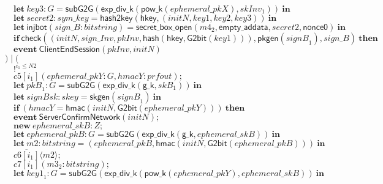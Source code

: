 \documentclass{article}
\newcommand{\cinput}[2]{{#1}({#2})}
\newcommand{\coutput}[2]{\overline{#1}\langle{#2}\rangle}
\newcommand{\kw}[1]{\mathbf{#1}}
\newcommand{\kwf}[1]{\mathsf{#1}}
\newcommand{\var}[1]{\mathit{#1}}
\newcommand{\kwt}[1]{\mathit{#1}}
\newcommand{\kwp}[1]{\mathit{#1}}
\newcommand{\kwc}[1]{\mathit{#1}}
\begin{document}
\begin{tabbing}
\>$\quad \kw{let}\ \var{key3}: \kwt{G} = \kwf{subG2G}(\kwf{exp{\_}div{\_}k}(\kwf{pow{\_}k}(\var{ephemeral{\_}pkX}), \var{skInv}_{1}))\ \kw{in}$\\
\>$\quad \kw{let}\ \var{secret2}: \kwt{sym{\_}key} = \kwf{hash2key}(\kwf{hkey}, \kwf{}(\var{initN}, \var{key1}, \var{key2}, \var{key3}))\ \kw{in}$\\
\>$\quad \kw{let}\ \kwf{injbot}(\var{sign{\_}B}: \kwt{bitstring}) = \kwf{secret{\_}box{\_}open}(\var{m4}_{2}, \kwf{empty{\_}addata}, \var{secret2}, \kwf{nonce0})\ \kw{in}$\\
\>$\quad \kw{if}\ \kwf{check}(\kwf{}(\var{initN}, \var{sign{\_}Inv}, \var{pkInv}, \kwf{hash}(\kwf{hkey}, \kwf{G2bit}(\var{key1}))), \kwf{pkgen}(\var{signB}_{1}), \var{sign{\_}B})\ \kw{then}$\\
\>$\quad \kw{event}\ \kwf{ClientEndSession}(\var{pkInv}, \var{initN})$\\
\>$) \mid ($\\
\>$\quad !^{\var{i}_{1} \leq \kwp{N2}}$\\
\>$\quad \cinput{\kwc{c5}[\var{i}_{1}]}{\var{ephemeral{\_}pkY}: \kwt{G}, \var{hmacY}: \kwt{prfout}};$\\
\>$\quad \kw{let}\ \var{pkB}_{1}: \kwt{G} = \kwf{subG2G}(\kwf{exp{\_}div{\_}k}(\kwf{g{\_}k}, \var{skB}_{1}))\ \kw{in}$\\
\>$\quad \kw{let}\ \var{signBsk}: \kwt{skey} = \kwf{skgen}(\var{signB}_{1})\ \kw{in}$\\
\>$\quad \kw{if}\ (\var{hmacY}  =  \kwf{hmac}(\var{initN}, \kwf{G2bit}(\var{ephemeral{\_}pkY})))\ \kw{then}$\\
\>$\quad \kw{event}\ \kwf{ServerConfirmNetwork}(\var{initN});$\\
\>$\quad \kw{new}\ \var{ephemeral{\_}skB}: \kwt{Z};$\\
\>$\quad \kw{let}\ \var{ephemeral{\_}pkB}: \kwt{G} = \kwf{subG2G}(\kwf{exp{\_}div{\_}k}(\kwf{g{\_}k}, \var{ephemeral{\_}skB}))\ \kw{in}$\\
\>$\quad \kw{let}\ \var{m2}: \kwt{bitstring} = \kwf{}(\var{ephemeral{\_}pkB}, \kwf{hmac}(\var{initN}, \kwf{G2bit}(\var{ephemeral{\_}pkB})))\ \kw{in}$\\
\>$\quad \coutput{\kwc{c6}[\var{i}_{1}]}{\var{m2}};$\\
\>$\quad \cinput{\kwc{c7}[\var{i}_{1}]}{\var{m3}_{2}: \kwt{bitstring}};$\\
\>$\quad \kw{let}\ \var{key1}_{1}: \kwt{G} = \kwf{subG2G}(\kwf{exp{\_}div{\_}k}(\kwf{pow{\_}k}(\var{ephemeral{\_}pkY}), \var{ephemeral{\_}skB}))\ \kw{in}$\\

\end{tabbing}
\end{document}
